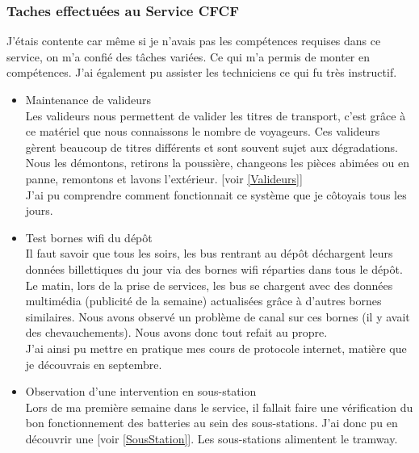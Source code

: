 \documentclass{article}
\begin{document}
        \subsubsection{Taches effectuées au Service CFCF}
        J'étais contente car même si je n'avais pas les compétences requises dans
        ce service, on m'a confié des tâches variées. Ce qui m'a permis de monter 
        en compétences. J'ai également pu assister les techniciens
        ce qui fu très instructif. 
        \begin{itemize}
            \item Maintenance de valideurs\\
            Les valideurs nous permettent de valider les titres de transport, c'est 
            grâce à ce matériel que nous connaissons le nombre de voyageurs. Ces 
            valideurs gèrent beaucoup de titres différents et sont souvent sujet aux 
            dégradations.\\
            Nous les démontons, retirons la poussière, changeons les pièces abimées ou en panne, 
            remontons et lavons l'extérieur. [voir \ref{Valideurs}] \\
            J'ai pu comprendre comment fonctionnait ce système que je côtoyais tous
            les jours.
            \item Test bornes wifi du dépôt\\
            Il faut savoir que tous les soirs, les bus rentrant au dépôt 
            déchargent leurs données billettiques du jour via des bornes wifi 
            réparties dans tous le dépôt. Le matin, lors de la prise de 
            services, les bus se chargent avec des données multimédia (publicité 
            de la semaine) actualisées grâce à d'autres bornes similaires. Nous 
            avons observé un problème de canal sur ces bornes (il y avait des 
            chevauchements). Nous avons donc tout refait au propre.\\
            J'ai ainsi pu mettre en pratique mes cours de protocole internet, matière
            que je découvrais en septembre. 
            \item Observation d'une intervention en sous-station\\
            Lors de ma première semaine dans le service, il fallait faire une vérification
            du bon fonctionnement des batteries au sein des sous-stations. J'ai donc pu en 
            découvrir une [voir \ref{SousStation}]. Les sous-stations alimentent le tramway. \\

\end{itemize}
\end{document}
